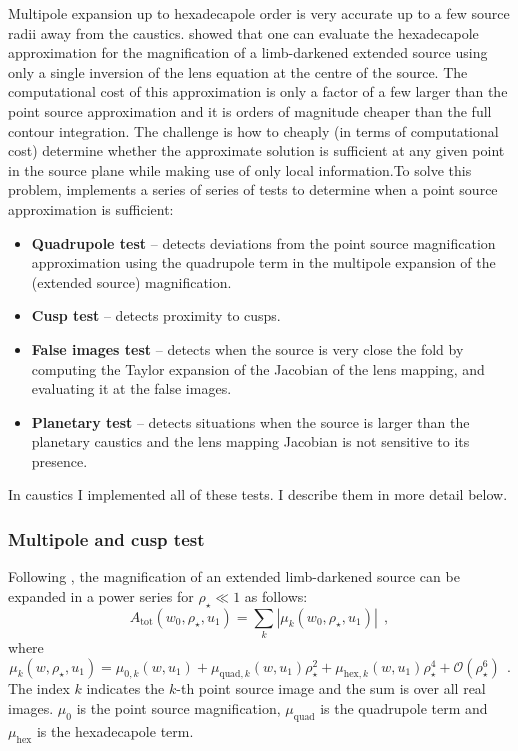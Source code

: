 \documentclass[12pt,dvipsnames]{report}
\newcommand{\ssf}[1]{\textsf{#1}}
\newcommand{\hquad}{~~}
\begin{document}
Multipole expansion up to hexadecapole order \citep{2008ApJ...681.1593G,2017MNRAS.468.3993C}
is very accurate up to a few source radii away from the caustics. \citet{2017MNRAS.468.3993C} showed
that one can evaluate the hexadecapole approximation for the magnification of a limb-darkened 
extended source using only a single inversion of the lens equation at the centre of the 
source. The computational cost of this approximation is only a factor of a few larger than 
the point source approximation and it is orders of magnitude cheaper than the full contour
integration.
The challenge is how to cheaply (in terms of computational cost) determine whether the approximate 
solution is sufficient at any given point in the source plane while making use of only 
local information.To solve this problem, \citet{2018MNRAS.479.5157B} implements a series of  
series of tests to determine when a point source approximation is sufficient:
\begin{itemize}
    \item \textbf{Quadrupole test} -- detects deviations from the point source 
    magnification approximation using 
    the quadrupole term in the multipole expansion of the (extended source) magnification.
    \item \textbf{Cusp test} -- detects proximity to cusps.
    \item \textbf{False images test} -- detects when the source is very close the fold by computing the 
    Taylor expansion of the Jacobian of the lens mapping, and evaluating it at the false images.
    \item \textbf{Planetary test} -- detects situations when the source is larger than 
    the planetary caustics and the lens mapping Jacobian is not sensitive to its presence.
\end{itemize}
In \ssf{caustics} I implemented all of these tests. I describe them in more detail below.

\subsubsection{Multipole and cusp test}
Following \citet{2017MNRAS.468.3993C}, the magnification of an extended limb-darkened source 
can be expanded in a power series for $\rho_\star\ll 1$ as follows:
\begin{equation}
    A_\mathrm{tot}(w_0,\rho_\star,u_1)=\sum_{k}|\mu_k(w_0,\rho_\star,u_1)|
    \hquad,
\end{equation}
where 
\begin{equation}
\mu_k(w,\rho_\star,u_1)=\mu_{0,k}(w,u_1) + \mu_{\mathrm{quad},k}(w,u_1)\rho_\star^2 + 
    \mu_{\mathrm{hex},k}(w,u_1)\rho_\star^4+\mathcal{O}(\rho_\star^6)
    \hquad.
\end{equation}
The index $k$ indicates the $k$-th point source image and the sum is over all real images.
$\mu_0$ is the point source magnification, $\mu_\mathrm{quad}$ is the quadrupole term 
and $\mu_\mathrm{hex}$ is the hexadecapole term. 
\end{document}
